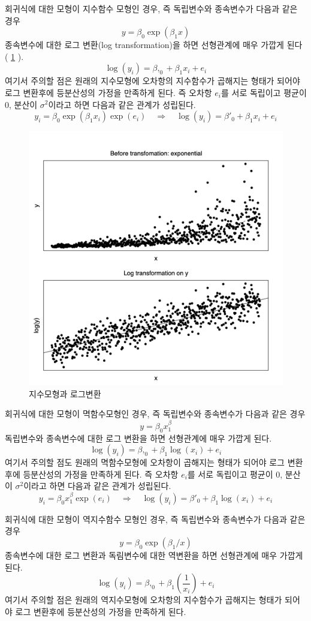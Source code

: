 \documentclass[
  10pt,
]{book}
\theoremstyle{definition}
\theoremstyle{definition}
\theoremstyle{definition}
\theoremstyle{definition}
\theoremstyle{remark}
\begin{document}
회귀식에 대한 모형이 지수함수 모형인 경우, 즉 독립변수와 종속변수가 다음과 같은 경우
\[ y = \beta_0 \exp (\beta_1 x) \]
종속변수에 대한 로그 변환(log transformation)을 하면 선형관계에 매우 가깝게 된다 ( \ref{fig:logtrans} ).
\[ \log(y_i) = \beta,_0 + \beta_1 x_i + e_i \]
여기서 주의할 점은 원래의 지수모형에 오차항의 지수함수가 곱해지는 형태가 되어야 로그 변환후에 등분산성의 가정을 만족하게 된다. 즉
오차항 \(e_i\)를 서로 독립이고 평균이 0, 분산이 \(\sigma^2\)이라고 하면 다음과 같은 관계가 성립된다.
\[ y_i = \beta_0 \exp (\beta_1 x_i)\exp(e_i) \quad \Rightarrow \quad \log(y_i) = \beta'_0 + \beta_1 x_i + e_i \]

\begin{figure}
\includegraphics[width=0.8\linewidth]{myimages/logtrans} \caption{지수모형과 로그변환}\label{fig:logtrans}
\end{figure}

회귀식에 대한 모형이 멱함수모형인 경우, 즉 독립변수와 종속변수가 다음과 같은 경우
\[ y = \beta_0  x^\beta_1 \]
독립변수와 종속변수에 대한 로그 변환을 하면 선형관계에 매우 가깝게 된다.
\[ \log(y_i) = \beta,_0 + \beta_1 \log(x_i) + e_i \]
여기서 주의할 점도 원래의 멱함수모형에 오차항이 곱해지는 형태가 되어야 로그 변환후에 등분산성의 가정을 만족하게 된다. 즉
오차항 \(e_i\)를 서로 독립이고 평균이 0, 분산이 \(\sigma^2\)이라고 하면 다음과 같은 관계가 성립된다.
\[ y_i = \beta_0  x^\beta_1 \exp(e_i) \quad \Rightarrow \quad \log(y_i) = \beta'_0 + \beta_1 \log(x_i) + e_i \]

회귀식에 대한 모형이 역지수함수 모형인 경우, 즉 독립변수와 종속변수가 다음과 같은 경우
\[ y = \beta_0 \exp (\beta_1/ x) \]
종속변수에 대한 로그 변환과 독림변수에 대한 역변환을 하면 선형관계에 매우 가깝게 된다.
\[ \log(y_i) = \beta,_0 + \beta_1 \left ( \frac{1}{x_i} \right ) + e_i \]
여기서 주의할 점은 원래의 역지수모형에 오차항의 지수함수가 곱해지는 형태가 되어야 로그 변환후에 등분산성의 가정을 만족하게 된다.
\end{document}
